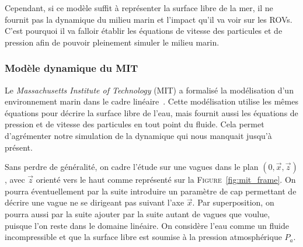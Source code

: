 				Cependant, si ce modèle suffit à représenter la surface libre de la mer, il ne fournit pas la dynamique du milieu marin et l'impact qu'il va voir sur les \gls{ROV}s. C'est pourquoi il va falloir établir les équations de vitesse des particules et de pression afin de pouvoir pleinement simuler le milieu marin.
				
			\subsubsection{Modèle dynamique du MIT}

				Le \textit{Massachusetts Institute of Technology} (\textsc{MIT}) a formalisé la modélisation d'un environnement marin dans le cadre linéaire~\cite{dean1991water, MIT_Waves}. Cette modélisation utilise les mêmes équations pour décrire la surface libre de l'eau, mais fournit aussi les équations de pression et de vitesse des particules en tout point du fluide. Cela permet d'agrémenter notre simulation de la dynamique qui nous manquait jusqu'à présent.

				Sans perdre de généralité, on cadre l'étude sur une vagues dans le plan $(0, \overrightarrow{x}, \overrightarrow{z})$, avec $\overrightarrow{z}$ orienté vers le haut comme représenté sur la \textsc{Figure}~\ref{fig:mit_frame}. On pourra éventuellement par la suite introduire un paramètre de cap permettant de décrire une vague ne se dirigeant pas suivant l'axe $\overrightarrow{x}$. Par superposition, on pourra aussi par la suite ajouter par la suite autant de vagues que voulue, puisque l'on reste dans le domaine linéaire. On considère l'eau comme un fluide incompressible et que la surface libre est soumise à la pression atmosphérique $P_a$.

